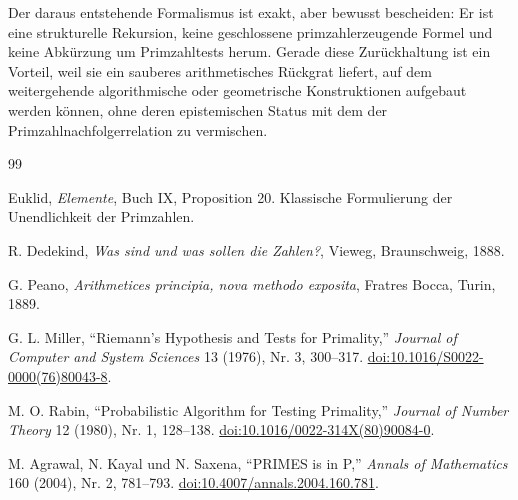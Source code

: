 \documentclass[11pt]{article}
\theoremstyle{definition}
\begin{document}
Der daraus entstehende Formalismus ist exakt, aber bewusst bescheiden: Er ist eine strukturelle Rekursion, keine geschlossene primzahlerzeugende Formel und keine Abkürzung um Primzahltests herum. Gerade diese Zurückhaltung ist ein Vorteil, weil sie ein sauberes arithmetisches Rückgrat liefert, auf dem weitergehende algorithmische oder geometrische Konstruktionen aufgebaut werden können, ohne deren epistemischen Status mit dem der Primzahlnachfolgerrelation zu vermischen.

\begin{thebibliography}{99}

Euklid,
\emph{Elemente}, Buch IX, Proposition 20.
Klassische Formulierung der Unendlichkeit der Primzahlen.

R. Dedekind,
\emph{Was sind und was sollen die Zahlen?},
Vieweg, Braunschweig, 1888.

G. Peano,
\emph{Arithmetices principia, nova methodo exposita},
Fratres Bocca, Turin, 1889.

G. L. Miller,
``Riemann's Hypothesis and Tests for Primality,''
\emph{Journal of Computer and System Sciences} 13 (1976), Nr. 3, 300--317.
\href{https://doi.org/10.1016/S0022-0000(76)80043-8}{doi:10.1016/S0022-0000(76)80043-8}.

M. O. Rabin,
``Probabilistic Algorithm for Testing Primality,''
\emph{Journal of Number Theory} 12 (1980), Nr. 1, 128--138.
\href{https://doi.org/10.1016/0022-314X(80)90084-0}{doi:10.1016/0022-314X(80)90084-0}.

M. Agrawal, N. Kayal und N. Saxena,
``PRIMES is in P,''
\emph{Annals of Mathematics} 160 (2004), Nr. 2, 781--793.
\href{https://doi.org/10.4007/annals.2004.160.781}{doi:10.4007/annals.2004.160.781}.

\end{thebibliography}
\end{document}
